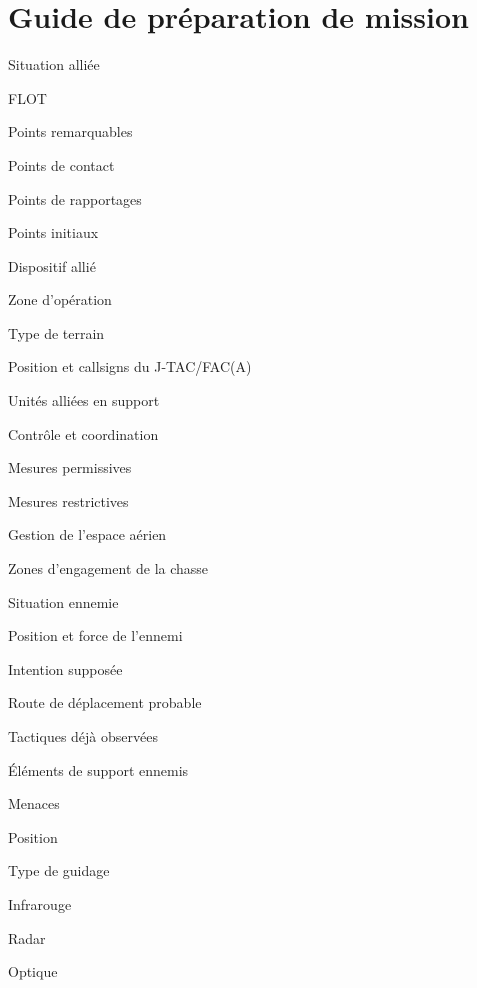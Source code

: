 \newpage

\chapter{Guide de préparation de mission}
\label{ch:missionplanningguide}

\e
    \item Situation alliée
    \ee
        \item FLOT
        \item Points remarquables
        \eee
            \item Points de contact
            \item Points de rapportages
            \item Points initiaux
        \ed
        \item Dispositif allié
        \eee
            \item Zone d’opération
            \item Type de terrain
            \item Position et callsigns du J-TAC/FAC(A)
            \item Unités alliées en support
        \ed
        \item Contrôle et coordination
        \eee
            \item Mesures permissives
            \item Mesures restrictives
        \ed
        \item Gestion de l’espace aérien
        \item Zones d’engagement de la chasse
    \ed
    \item Situation ennemie
    \ee
        \item Position et force de l’ennemi
        \eee
            \item Intention supposée
            \item Route de déplacement probable
            \item Tactiques déjà observées
        \ed
        \item Éléments de support ennemis
        \item Menaces
        \eee
            \item Position
            \item Type de guidage
            \eeee
                \item Infrarouge
                \item Radar
                \item Optique
